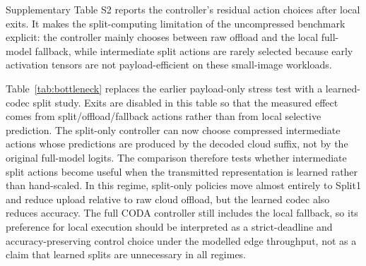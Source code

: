 \documentclass[11pt]{article}
\begin{document}
\begin{table}[t]
\centering
\caption{Ablation. Conformal exits provide most of the latency and upload
improvement; the coupled controller is responsible for driving deadline misses
toward zero relative to conformal-exit alone.}
\label{tab:ablation}
\end{table}

Supplementary Table S2 reports the controller's residual action choices after
local exits. It makes the split-computing limitation of the uncompressed
benchmark explicit: the controller mainly chooses between raw offload and the
local full-model fallback, while intermediate split actions are rarely selected
because early activation tensors are not payload-efficient on these small-image
workloads.

Table~\ref{tab:bottleneck} replaces the earlier payload-only stress test with a
learned-codec split study. Exits are disabled in this table so that the measured
effect comes from split/offload/fallback actions rather than from local
selective prediction. The split-only controller can now choose compressed
intermediate actions whose predictions are produced by the decoded cloud suffix,
not by the original full-model logits. The comparison therefore tests whether
intermediate split actions become useful when the transmitted representation is
learned rather than hand-scaled. In this regime, split-only policies move almost
entirely to Split1 and reduce upload relative to raw cloud offload, but the
learned codec also reduces accuracy. The full CODA controller still includes the
local fallback, so its preference for local execution should be interpreted as a
strict-deadline and accuracy-preserving control choice under the modelled edge
throughput, not as a claim that learned splits are unnecessary in all regimes.
\end{document}
